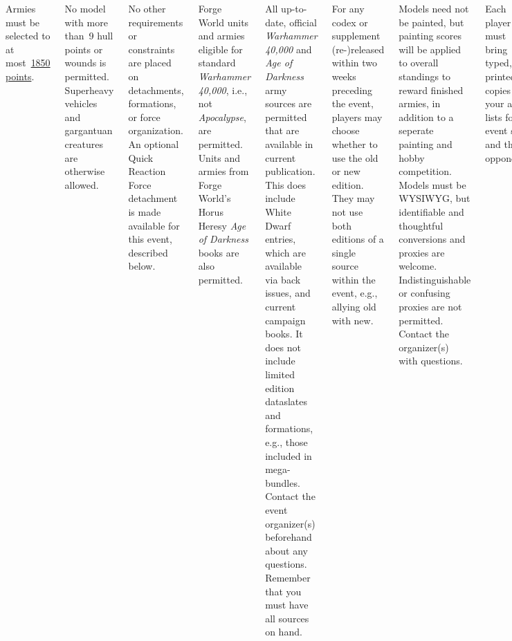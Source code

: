 \documentclass{40k}
\begin{document}

\begin{columns}


Armies must be selected to at most~\underline{1850 points}.

No model with more than~9 hull points or wounds is permitted.
Superheavy vehicles and gargantuan creatures are otherwise allowed.

No other requirements or constraints are placed on detachments,
formations, or force organization. An optional Quick Reaction Force
detachment is made available for this event, described below.


Forge World units and armies eligible for standard \emph{Warhammer
  40,000}, i.e., not \emph{Apocalypse}, are permitted. Units and
armies from Forge World's Horus Heresy \emph{Age of Darkness} books
are also permitted.

All up-to-date, official \emph{Warhammer 40,000} and \emph{Age of
  Darkness} army sources are permitted that are available in current
publication. This does include White Dwarf entries, which are
available via back issues, and current campaign books. It does not
include limited edition dataslates and formations, e.g., those
included in mega-bundles. Contact the event organizer(s) beforehand
about any questions. Remember that you must have all sources on hand.

For any codex or supplement (re-)released within two weeks preceding
the event, players may choose whether to use the old or new
edition. They may not use both editions of a single source within the
event, e.g., allying old with new.


Models need not be painted, but painting scores will be applied to
overall standings to reward finished armies, in addition to a seperate
painting and hobby competition.  Models must be WYSIWYG, but
identifiable and thoughtful conversions and proxies are
welcome. Indistinguishable or confusing proxies are not
permitted. Contact the organizer(s) with questions.


Each player must bring typed, printed copies of your army lists for
event staff and their opponents.

You must have an official, legal, complete physical or digital copy on
hand for all army, unit, and other sources you are using. You should
bring printed copies of relevant pages of any electronic
sources. Don't forget errata and FAQs for your sources, available from
Games Workshop's Rules Errata webpage.


\end{columns}
\end{document}
